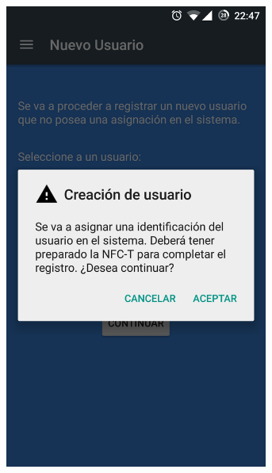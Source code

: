 \documentclass[../PFC.tex]{subfiles}
\begin{document}
\begin{figure}[H]
\begin{subfigure}{0.32\textwidth}
		\includegraphics[width=0.95\textwidth]{./img/app/nuevoUsuarioDialog}
    \end{subfigure}          
    \begin{subfigure}{0.32\textwidth}  
       \centering

\end{subfigure}
\end{figure}
\end{document}
